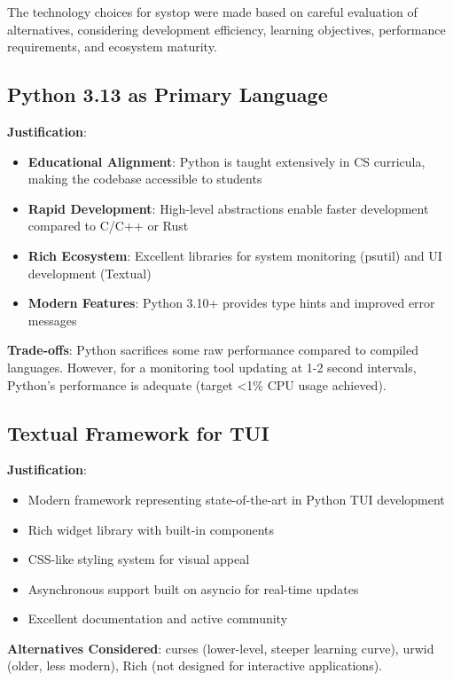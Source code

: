 \documentclass[12pt,a4paper,oneside]{report}
\begin{document}
The technology choices for systop were made based on careful evaluation of alternatives, considering development efficiency, learning objectives, performance requirements, and ecosystem maturity.

\subsection{Python 3.13 as Primary Language}

\textbf{Justification}:
\begin{itemize}
    \item \textbf{Educational Alignment}: Python is taught extensively in CS curricula, making the codebase accessible to students
    \item \textbf{Rapid Development}: High-level abstractions enable faster development compared to C/C++ or Rust
    \item \textbf{Rich Ecosystem}: Excellent libraries for system monitoring (psutil) and UI development (Textual)
    \item \textbf{Modern Features}: Python 3.10+ provides type hints and improved error messages
\end{itemize}

\textbf{Trade-offs}: Python sacrifices some raw performance compared to compiled languages. However, for a monitoring tool updating at 1-2 second intervals, Python's performance is adequate (target <1\% CPU usage achieved).

\subsection{Textual Framework for TUI}

\textbf{Justification}:
\begin{itemize}
    \item Modern framework representing state-of-the-art in Python TUI development
    \item Rich widget library with built-in components
    \item CSS-like styling system for visual appeal
    \item Asynchronous support built on asyncio for real-time updates
    \item Excellent documentation and active community
\end{itemize}

\textbf{Alternatives Considered}: curses (lower-level, steeper learning curve), urwid (older, less modern), Rich (not designed for interactive applications).
\end{document}
